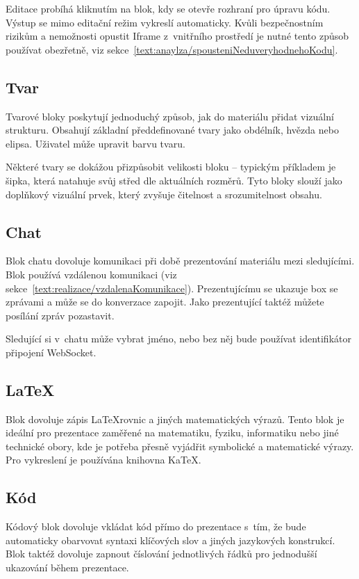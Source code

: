 Editace probíhá kliknutím na blok, kdy se otevře rozhraní pro úpravu kódu. 
Výstup se mimo editační režim vykreslí automaticky. 
Kvůli bezpečnostním rizikům a nemožnosti opustit Iframe z~vnitřního prostředí je nutné tento způsob používat obezřetně, viz sekce~\ref{text:anaylza/spousteniNeduveryhodnehoKodu}.

\subsection{Tvar}

Tvarové bloky poskytují jednoduchý způsob, jak do materiálu přidat vizuální strukturu. 
Obsahují základní předdefinované tvary jako obdélník, hvězda nebo elipsa. Uživatel může upravit barvu tvaru.

Některé tvary se dokážou přizpůsobit velikosti bloku -- typickým příkladem je šipka, která natahuje svůj střed dle aktuálních rozměrů.
Tyto bloky slouží jako doplňkový vizuální prvek, který zvyšuje čitelnost a srozumitelnost obsahu.

\subsection{Chat}

Blok chatu dovoluje komunikaci při době prezentování materiálu mezi sledujícími.
Blok používá vzdálenou komunikaci (viz sekce~\ref{text:realizace/vzdalenaKomunikace}).
Prezentujícímu se ukazuje box se zprávami a může se do konverzace zapojit.
Jako prezentující taktéž můžete posílání zpráv pozastavit.

Sledující si v~chatu může vybrat jméno, nebo bez něj bude používat identifikátor připojení WebSocket.

\subsection{\LaTeX}

Blok dovoluje zápis \LaTeX rovnic a jiných matematických výrazů.
Tento blok je ideální pro prezentace zaměřené na matematiku, fyziku, informatiku nebo jiné technické obory, kde je potřeba přesně vyjádřit symbolické a matematické výrazy.
Pro vykreslení je používána knihovna KaTeX.

\subsection{Kód}

Kódový blok dovoluje vkládat kód přímo do prezentace s~tím, že bude automaticky obarvovat syntaxi klíčových slov a jiných jazykových konstrukcí.
Blok taktéž dovoluje zapnout číslování jednotlivých řádků pro jednodušší ukazování během prezentace.

